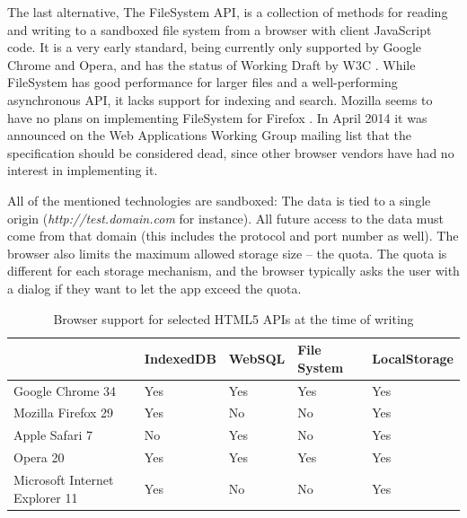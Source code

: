 The last alternative, The FileSystem API, is a collection of methods for reading and writing to a sandboxed file system from a browser with client JavaScript code. It is a very early standard, being currently only supported by Google Chrome and Opera, and has the status of Working Draft by W3C \cite{FileSystem:Online}. While FileSystem has good performance for larger files and a well-performing asynchronous API, it lacks support for indexing and search. Mozilla seems to have no plans on implementing FileSystem for Firefox \cite{MozillaFileSystem:Online}. In April 2014 it was announced on the Web Applications Working Group mailing list that the specification should be considered dead, since other browser vendors have had no interest in implementing it\cite{FileSystemMailingList:Online}.

All of the mentioned technologies are sandboxed: The data is tied to a single origin (\emph{http://test.domain.com} for instance). All future access to the data must come from that domain (this includes the protocol and port number as well). The browser also limits the maximum allowed storage size – the quota. The quota is different for each storage mechanism, and the browser typically asks the user with a dialog if they want to let the app exceed the quota.

\begin{table}
    \begin{tabular}{|l|l|l|l|l|}
    \hline
                       & IndexedDB & WebSQL & File System & LocalStorage \\ \hline
    Google Chrome 34               & Yes       & Yes    & Yes  & Yes                      \\ \hline
    Mozilla Firefox 29             & Yes       & \cellcolor{red}No  & \cellcolor{red}No   & Yes                        \\ \hline
    Apple Safari 7                & \cellcolor{red}No        & Yes  & \cellcolor{red}No    & Yes                        \\ \hline
    Opera 20                       & Yes       & Yes    & Yes  & Yes                      \\ \hline
    Microsoft Internet Explorer 11 & Yes       & \cellcolor{red}No  & \cellcolor{red}No   & Yes                        \\ \hline
    \end{tabular}
    \caption {Browser support for selected HTML5 APIs at the time of writing}
\end{table}

